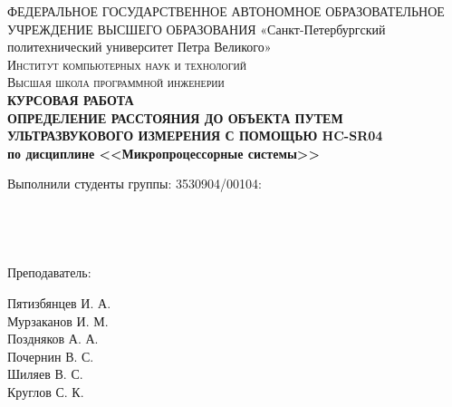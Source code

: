 \documentclass[a4paper, 14pt]{article}
\begin{document}
\begin{titlepage}
	\center

	ФЕДЕРАЛЬНОЕ ГОСУДАРСТВЕННОЕ АВТОНОМНОЕ ОБРАЗОВАТЕЛЬНОЕ УЧРЕЖДЕНИЕ ВЫСШЕГО ОБРАЗОВАНИЯ\linebreak
	«Санкт-Петербургский политехнический университет Петра Великого»\\[1cm]
	\textsc{\Large Институт компьютерных наук и технологий}\\
    \textsc{\large Высшая школа программной инженерии}\\[3.5cm]

	{ \huge \bfseries КУРСОВАЯ РАБОТА	\\
	\Large \mdseries ОПРЕДЕЛЕНИЕ РАССТОЯНИЯ ДО ОБЪЕКТА ПУТЕМ УЛЬТРАЗВУКОВОГО ИЗМЕРЕНИЯ С ПОМОЩЬЮ HC-SR04 \\
	\large по дисциплине <<Микропроцессорные системы>>}\\[6.5cm]


	\begin{multicols}{2}
		\begin{flushright} \large

			{Выполнили студенты группы: 3530904/00104:}\\
            {\phantom{qwe}}\\
            {\phantom{qwe}}\\
            {\phantom{qwe}}\\
            {\phantom{qwe}}\\

			{Преподаватель:\\}

		\end{flushright}
		\begin{flushright}

			{Пятизбянцев И. А.}\\
			{Мурзаканов И. М.}\\
			{Поздняков А. А.}\\
			{Почернин В. С.}\\
			{Шиляев В. С.}\\[0.5cm]


			Круглов С. К.\\

		\end{flushright}
	\end{multicols}

	\flushright{
        {\phantom{qwe}}\\[4.5cm]
		{\today}\\
	}

	\vfill
\end{titlepage}
\end{document}
